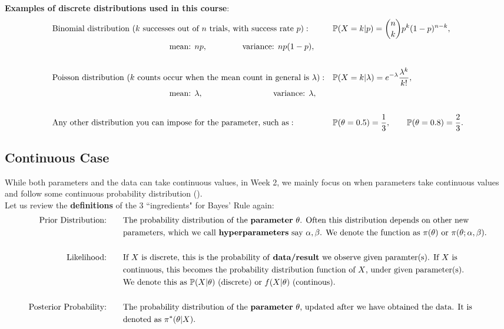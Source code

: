 \documentclass{article}
\begin{document}
\textbf{Examples of discrete distributions used in this course}:
\begin{align*}
& \text{Binomial distribution ($k$ successes out of $n$ trials, with success rate $p$)}: &  & \mathbb{P}(X = k|p)=\binom{n}{k}p^k(1-p)^{n-k}, \\
& \hspace{5cm} \text{mean: $np$}, \hspace{1.5cm} \text{variance: $np(1-p)$}, && \\
&  && \\
& \text{Poisson distribution ($k$ counts occur when the mean count in general is $\lambda$)}: &   & \mathbb{P}(X = k|\lambda) = e^{-\lambda}\frac{\lambda^k}{k!},\\
& \hspace{5cm} \text{mean: $\lambda$}, \hspace{3cm} \text{variance: $\lambda$},\\
&  && \\
& \text{Any other distribution you can impose for the parameter, such as}: &  & \mathbb{P}(\theta = 0.5) = \frac{1}{3},\qquad \mathbb{P}(\theta = 0.8) = \frac{2}{3}.
\end{align*}

\subsection{Continuous Case}

While both parameters and the data can take continuous values, in Week 2, we mainly focus on when parameters take continuous values and follow some continuous probability distribution ().\\

Let us review the \textbf{definitions} of the 3 ``ingredients" for Bayes' Rule again:\\
\begin{align*}
\text{Prior Distribution:} & \qquad \text{The probability distribution of the \textbf{parameter} $\theta$. Often this distribution depends on other new}\\
& \qquad \text{parameters, which we call \textbf{hyperparameters} say $\alpha, \beta$. We denote the function as $\pi(\theta)$ or $\pi(\theta; \alpha, \beta)$}.\\
& \\
\text{Likelihood:}  & \qquad \text{If $X$ is discrete, this is the probability of \textbf{data/result} we observe given paramter(s). If $X$ is }\\
& \qquad \text{continuous, this becomes the probability distribution function of $X$, under given parameter(s).}\\
& \qquad \text{We denote this as $\mathbb{P}(X|\theta)$ (discrete) or $f(X|\theta)$ (continous)}.\\
& \\
\text{Posterior Probability:} & \qquad \text{The probability distribution of the \textbf{parameter} $\theta$, updated after we have obtained the data. It is }\\
& \qquad\text{denoted as $\mathbb{\pi^*}(\theta|X)$}.
\end{align*}
\end{document}
